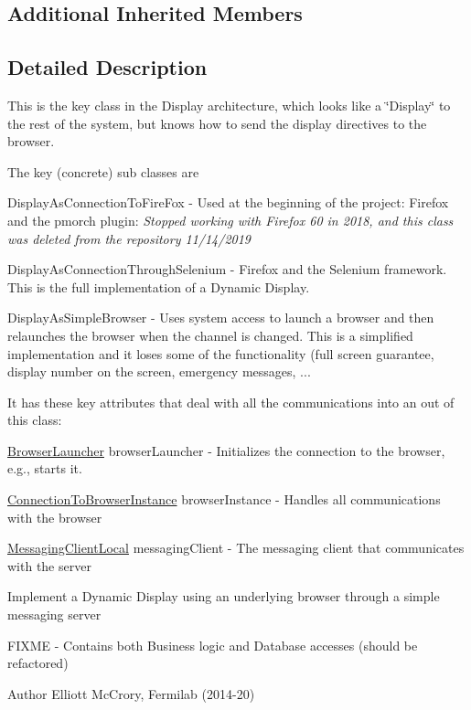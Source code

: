 \subsection*{Additional Inherited Members}


\subsection{Detailed Description}
This is the key class in the Display architecture, which looks like a \char`\"{}\-Display\char`\"{} to the rest of the system, but knows how to send the display directives to the browser. 

The key (concrete) sub classes are 
\begin{DoxyItemize}
\item Display\-As\-Connection\-To\-Fire\-Fox -\/ Used at the beginning of the project\-: Firefox and the pmorch plugin\-: {\itshape Stopped working with Firefox 60 in 2018, and this class was deleted from the repository 11/14/2019} 
\item Display\-As\-Connection\-Through\-Selenium -\/ Firefox and the Selenium framework. This is the full implementation of a Dynamic Display. 
\item Display\-As\-Simple\-Browser -\/ Uses system access to launch a browser and then relaunches the browser when the channel is changed. This is a simplified implementation and it loses some of the functionality (full screen guarantee, display number on the screen, emergency messages, ... 





It has these key attributes that deal with all the communications into an out of this class\-: 
\begin{DoxyEnumerate}
\item \hyperlink{classgov_1_1fnal_1_1ppd_1_1dd_1_1display_1_1client_1_1BrowserLauncher}{Browser\-Launcher} browser\-Launcher -\/ Initializes the connection to the browser, e.\-g., starts it. 
\item \hyperlink{classgov_1_1fnal_1_1ppd_1_1dd_1_1display_1_1client_1_1ConnectionToBrowserInstance}{Connection\-To\-Browser\-Instance} browser\-Instance -\/ Handles all communications with the browser 
\item \hyperlink{classgov_1_1fnal_1_1ppd_1_1dd_1_1display_1_1client_1_1DisplayControllerMessagingAbstract_1_1MessagingClientLocal}{Messaging\-Client\-Local} messaging\-Client -\/ The messaging client that communicates with the server 
\end{DoxyEnumerate}



Implement a Dynamic Display using an underlying browser through a simple messaging server

F\-I\-X\-M\-E -\/ Contains both Business logic and Database accesses (should be refactored)

\begin{DoxyAuthor}{Author}
Elliott Mc\-Crory, Fermilab (2014-\/20) 
\end{DoxyAuthor}

\end{DoxyItemize}

